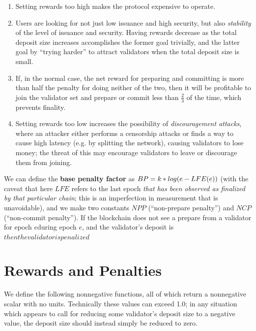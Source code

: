 \documentclass[12pt, final]{article}
\newcommand{\epoch}{\ensuremath{e}\space}
\begin{document}
\begin{enumerate}
\item Setting rewards too high makes the protocol expensive to operate.
\item Users are looking for not just low issuance and high security, but also \textit{stability} of the level of issuance and security. Having rewards decrease as the total deposit size increases accomplishes the former goal trivially, and the latter goal by ``trying harder'' to attract validators when the total deposit size is small.
\item If, in the normal case, the net reward for preparing and committing is more than half the penalty for doing neither of the two, then it will be profitable to join the validator set and prepare or commit less than $\frac{2}{3}$ of the time, which prevents finality.
\item Setting rewards too low increases the possibility of \textit{discouragement attacks}, where an attacker either performs a censorship attacks or finds a way to cause high latency (e.g. by splitting the network), causing validators to lose money; the threat of this may encourage validators to leave or discourage them from joining.
\end{enumerate}

We can define the \textbf{base penalty factor} as $BP = k * log(\epoch - LFE(\epoch))$ (with the caveat that here $LFE$ refers to the last epoch \textit{that has been observed as finalized by that particular chain}; this is an imperfection in measurement that is unavoidable), and we make two constants $NPP$ (``non-prepare penalty'') and $NCP$ (``non-commit penalty''). If the blockchain does not see a prepare from a validator for epoch \epoch during epoch \epoch, and the validator's deposit is $ then the validator is penalized $

\section{Rewards and Penalties}

We define the following nonnegative functions, all of which return a nonnegative scalar with no units. Technically these values can exceed 1.0; in any situation which appears to call for reducing some validator's deposit size to a negative value, the deposit size should instead simply be reduced to zero.
\end{document}
